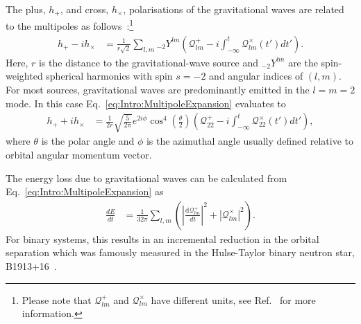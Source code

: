 \documentclass[../Thesis.tex]{subfiles}
\begin{document}
    The plus, $h_{+}$, and cross, $h_{\times}$, polarisations of the gravitational waves are related to the multipoles as follows~\cite{Moncrief1974,Abrahams1996,Andrade1999,Nagar2005,Baiotti2008}:\footnote{Please note that $\mathcal{Q}^+_{lm}$ and $\mathcal{Q}^\times_{lm}$ have different units, see Ref.~\cite{Nagar2005} for more information.}
     \begin{align}
        h_{+} - i h_{\times} & = \frac{1}{r\sqrt{2}}\sum_{l,m} {}_{-2}Y^{lm}\left(\mathcal{Q}^{+}_{lm} -i \int_{-\infty}^t\mathcal{Q}^\times_{lm}(t')dt'\right). \label{eq:Intro:MultipoleExpansion}
    \end{align}   
    Here, $r$ is the distance to the gravitational-wave source and ${}_{-2}Y^{lm}$ are the spin-weighted spherical harmonics with spin $s=-2$ and angular indices of $(l,m)$.
    For most sources, gravitational waves are predominantly emitted in the $l=m=2$ mode. 
    In this case Eq.~\ref{eq:Intro:MultipoleExpansion} evaluates to
     \begin{align}
        h_{+} + i h_{\times} & = \frac{1}{2 r} \sqrt{\frac{5}{2\pi }} e^{2 i \phi } \cos ^4\left(\frac{\theta }{2}\right)\left(\mathcal{Q}^{+}_{22} -i \int_{-\infty}^t\mathcal{Q}^\times_{22}(t')dt'\right), \label{eq:Intro:MultipoleExpansionlm22}
    \end{align}
    where  $\theta$ is the polar angle and $\phi$ is the azimuthal angle usually defined relative to orbital angular momentum vector. \par
    
    The energy loss due to gravitational waves can be calculated from Eq.~\ref{eq:Intro:MultipoleExpansion} as~\cite{Nagar2005}
     \begin{align}
        \frac{dE}{dt} & = \frac{1}{32 \pi}\sum_{l,m} \left(\left|\frac{\mathrm{d} \mathcal{Q}^{+}_{lm}}{dt}\right|^2 + \left|\mathcal{Q}^\times_{lm}\right|^2\right). \label{eq:Intro:EnergyLoss}
    \end{align}
    For binary systems, this results in an incremental reduction in the orbital separation which was famously measured in the Hulse-Taylor binary neutron star, B1913+16~\cite{Hulse1975,Taylor1982,Weisberg2016}. \par 
    
\end{document}
